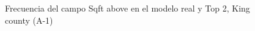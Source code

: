 \begin{figure}[H]
    \centering
    
    \caption{Frecuencia del campo Sqft above en el modelo real y Top 2, King county (A-1)}
    \label{frecuency-top2-sqft above}
\end{figure}